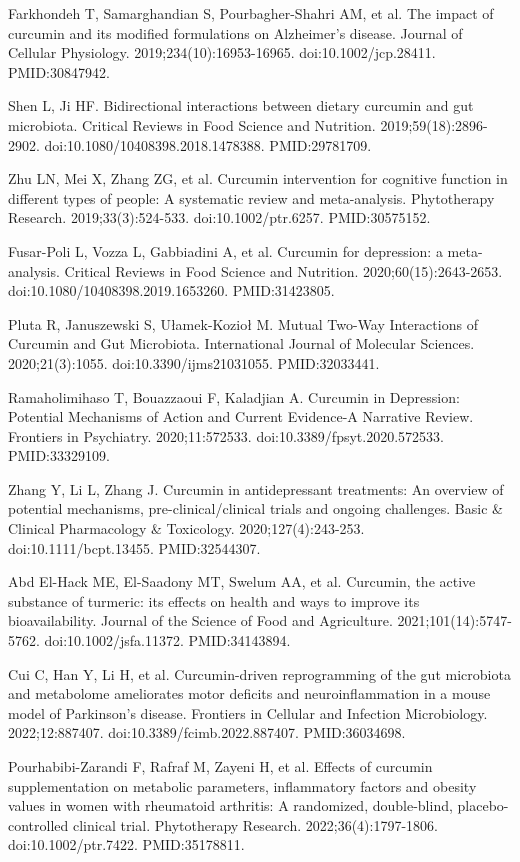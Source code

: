 \documentclass[12pt,oneside]{book}
\newcommand{\reff}[2]{\par\hangindent=7mm\hangafter=1\noindent[#1]\hspace{2mm}#2\par}
\begin{document}
\reff{9}{Farkhondeh T, Samarghandian S, Pourbagher-Shahri AM, et al. The impact of curcumin and its modified formulations on Alzheimer's disease. Journal of Cellular Physiology. 2019;234(10):16953-16965. doi:10.1002/jcp.28411. PMID:30847942.}

\reff{10}{Shen L, Ji HF. Bidirectional interactions between dietary curcumin and gut microbiota. Critical Reviews in Food Science and Nutrition. 2019;59(18):2896-2902. doi:10.1080/10408398.2018.1478388. PMID:29781709.}

\reff{11}{Zhu LN, Mei X, Zhang ZG, et al. Curcumin intervention for cognitive function in different types of people: A systematic review and meta-analysis. Phytotherapy Research. 2019;33(3):524-533. doi:10.1002/ptr.6257. PMID:30575152.}

\reff{12}{Fusar-Poli L, Vozza L, Gabbiadini A, et al. Curcumin for depression: a meta-analysis. Critical Reviews in Food Science and Nutrition. 2020;60(15):2643-2653. doi:10.1080/10408398.2019.1653260. PMID:31423805.}

\reff{13}{Pluta R, Januszewski S, Ułamek-Kozioł M. Mutual Two-Way Interactions of Curcumin and Gut Microbiota. International Journal of Molecular Sciences. 2020;21(3):1055. doi:10.3390/ijms21031055. PMID:32033441.}

\reff{14}{Ramaholimihaso T, Bouazzaoui F, Kaladjian A. Curcumin in Depression: Potential Mechanisms of Action and Current Evidence-A Narrative Review. Frontiers in Psychiatry. 2020;11:572533. doi:10.3389/fpsyt.2020.572533. PMID:33329109.}

\reff{15}{Zhang Y, Li L, Zhang J. Curcumin in antidepressant treatments: An overview of potential mechanisms, pre-clinical/clinical trials and ongoing challenges. Basic \& Clinical Pharmacology \& Toxicology. 2020;127(4):243-253. doi:10.1111/bcpt.13455. PMID:32544307.}

\reff{16}{Abd El-Hack ME, El-Saadony MT, Swelum AA, et al. Curcumin, the active substance of turmeric: its effects on health and ways to improve its bioavailability. Journal of the Science of Food and Agriculture. 2021;101(14):5747-5762. doi:10.1002/jsfa.11372. PMID:34143894.}

\reff{17}{Cui C, Han Y, Li H, et al. Curcumin-driven reprogramming of the gut microbiota and metabolome ameliorates motor deficits and neuroinflammation in a mouse model of Parkinson's disease. Frontiers in Cellular and Infection Microbiology. 2022;12:887407. doi:10.3389/fcimb.2022.887407. PMID:36034698.}

\reff{18}{Pourhabibi-Zarandi F, Rafraf M, Zayeni H, et al. Effects of curcumin supplementation on metabolic parameters, inflammatory factors and obesity values in women with rheumatoid arthritis: A randomized, double-blind, placebo-controlled clinical trial. Phytotherapy Research. 2022;36(4):1797-1806. doi:10.1002/ptr.7422. PMID:35178811.}
\end{document}

